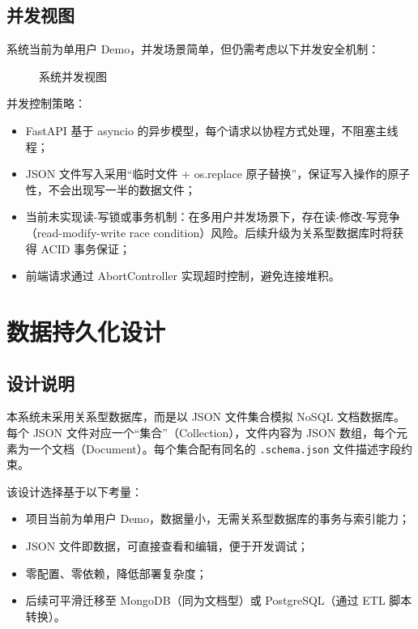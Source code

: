 \documentclass[12pt,a4paper]{ctexart}
\begin{document}
\subsection{并发视图}

系统当前为单用户 Demo，并发场景简单，但仍需考虑以下并发安全机制：

\begin{figure}[H]
  \centering
  \caption{系统并发视图}
  \label{fig:concurrency-view}
\end{figure}

并发控制策略：
\begin{itemize}
  \item FastAPI 基于 asyncio 的异步模型，每个请求以协程方式处理，不阻塞主线程；
  \item JSON 文件写入采用“临时文件 + os.replace 原子替换”，保证写入操作的原子性，不会出现写一半的数据文件；
  \item 当前未实现读-写锁或事务机制：在多用户并发场景下，存在读-修改-写竞争（read-modify-write race condition）风险。后续升级为关系型数据库时将获得 ACID 事务保证；
  \item 前端请求通过 AbortController 实现超时控制，避免连接堆积。
\end{itemize}

\newpage

\section{数据持久化设计}

\subsection{设计说明}

本系统未采用关系型数据库，而是以 JSON 文件集合模拟 NoSQL 文档数据库。每个 JSON 文件对应一个“集合”（Collection），文件内容为 JSON 数组，每个元素为一个文档（Document）。每个集合配有同名的 \texttt{.schema.json} 文件描述字段约束。

该设计选择基于以下考量：
\begin{itemize}
  \item 项目当前为单用户 Demo，数据量小，无需关系型数据库的事务与索引能力；
  \item JSON 文件即数据，可直接查看和编辑，便于开发调试；
  \item 零配置、零依赖，降低部署复杂度；
  \item 后续可平滑迁移至 MongoDB（同为文档型）或 PostgreSQL（通过 ETL 脚本转换）。
\end{itemize}
\end{document}

